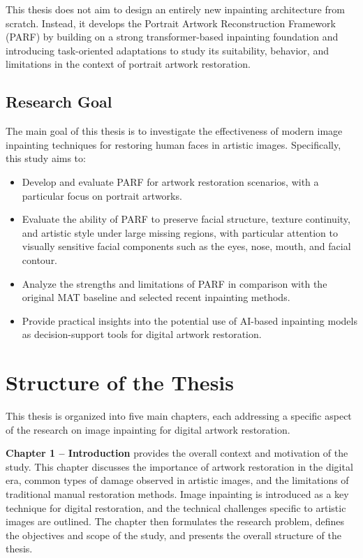 \documentclass[12pt, twoside]{report}
\begin{document}
This thesis does not aim to design an entirely new inpainting architecture from scratch. Instead, it develops the Portrait Artwork Reconstruction Framework (PARF) by building on a strong transformer-based inpainting foundation and introducing task-oriented adaptations to study its suitability, behavior, and limitations in the context of portrait artwork restoration.

\subsection{Research Goal}
The main goal of this thesis is to investigate the effectiveness of modern image inpainting techniques for restoring human faces in artistic images. Specifically, this study aims to:
\begin{itemize}
    \item Develop and evaluate PARF for artwork restoration scenarios, with a particular focus on portrait artworks.
    \item Evaluate the ability of PARF to preserve facial structure, texture continuity, and artistic style under large missing regions, with particular attention to visually sensitive facial components such as the eyes, nose, mouth, and facial contour.
    \item Analyze the strengths and limitations of PARF in comparison with the original MAT baseline and selected recent inpainting methods.
    \item Provide practical insights into the potential use of AI-based inpainting models as decision-support tools for digital artwork restoration.
\end{itemize}


\section{Structure of the Thesis}

This thesis is organized into five main chapters, each addressing a specific aspect of the research on image inpainting for digital artwork restoration.

\par \hspace{0.5cm} \textbf{Chapter 1 -- Introduction} provides the overall context and motivation of the study. This chapter discusses the importance of artwork restoration in the digital era, common types of damage observed in artistic images, and the limitations of traditional manual restoration methods. Image inpainting is introduced as a key technique for digital restoration, and the technical challenges specific to artistic images are outlined. The chapter then formulates the research problem, defines the objectives and scope of the study, and presents the overall structure of the thesis.
\end{document}
